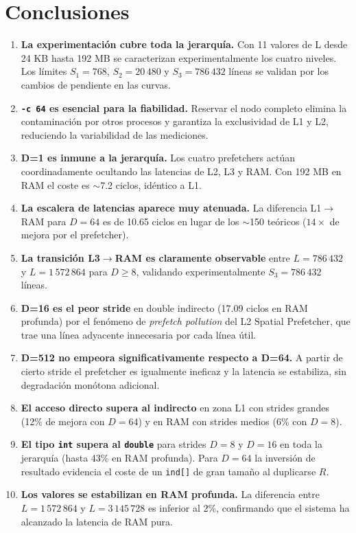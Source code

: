 \documentclass[12pt,a4paper]{article}
\begin{document}
\section{Conclusiones}

\begin{enumerate}[leftmargin=1.5em]
  \item \textbf{La experimentación cubre toda la jerarquía.} Con 11 valores de L desde 24 KB hasta 192 MB se caracterizan experimentalmente los cuatro niveles.
  Los límites $S_1=768$, $S_2=20\,480$ y $S_3=786\,432$ líneas se validan por los cambios de pendiente en las curvas.
  \item \textbf{\texttt{-c 64} es esencial para la fiabilidad.} Reservar el nodo completo elimina la contaminación por otros procesos y garantiza la exclusividad de L1 y L2, reduciendo la variabilidad de las mediciones.
  \item \textbf{D=1 es inmune a la jerarquía.} Los cuatro prefetchers actúan coordinadamente ocultando las latencias de L2, L3 y RAM. Con 192 MB en RAM el coste es $\sim$7.2 ciclos, idéntico a L1.
  \item \textbf{La escalera de latencias aparece muy atenuada.} La diferencia L1$\to$RAM para $D=64$ es de 10.65 ciclos en lugar de los $\sim$150 teóricos ($14\times$ de mejora por el prefetcher).
  \item \textbf{La transición L3$\to$RAM es claramente observable} entre $L=786\,432$ y $L=1\,572\,864$ para $D \geq 8$, validando experimentalmente $S_3 = 786\,432$ líneas.
  \item \textbf{D=16 es el peor stride} en double indirecto (17.09 ciclos en RAM profunda) por el fenómeno de \emph{prefetch pollution} del L2 Spatial Prefetcher, que trae una línea adyacente innecesaria por cada línea útil.
  \item \textbf{D=512 no empeora significativamente respecto a D=64.} A partir de cierto stride el prefetcher es igualmente ineficaz y la latencia se estabiliza, sin degradación monótona adicional.
  \item \textbf{El acceso directo supera al indirecto} en zona L1 con strides grandes (12\% de mejora con $D=64$) y en RAM con strides medios (6\% con $D=8$).
  \item \textbf{El tipo \texttt{int} supera al \texttt{double}} para strides $D=8$ y $D=16$ en toda la jerarquía (hasta 43\% en RAM profunda). Para $D=64$ la inversión de resultado evidencia el coste de un \texttt{ind[]} de gran tamaño al duplicarse $R$.
  \item \textbf{Los valores se estabilizan en RAM profunda.} La diferencia entre $L=1\,572\,864$ y $L=3\,145\,728$ es inferior al 2\%, confirmando que el sistema ha alcanzado la latencia de RAM pura.
\end{enumerate}
\end{document}
